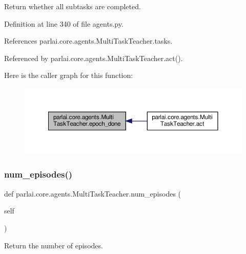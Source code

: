 \begin{DoxyVerb}Return whether all subtasks are completed.\end{DoxyVerb}
 

Definition at line 340 of file agents.\+py.



References parlai.\+core.\+agents.\+Multi\+Task\+Teacher.\+tasks.



Referenced by parlai.\+core.\+agents.\+Multi\+Task\+Teacher.\+act().

Here is the caller graph for this function\+:
\nopagebreak
\begin{figure}[H]
\begin{center}
\leavevmode
\includegraphics[width=350pt]{classparlai_1_1core_1_1agents_1_1MultiTaskTeacher_a17444e342ab19c23cee28bba08a64df9_icgraph}
\end{center}
\end{figure}
\mbox{\label{classparlai_1_1core_1_1agents_1_1MultiTaskTeacher_ac292d1cb86a3769c352e2d3658f324d2}} 
\subsubsection{\texorpdfstring{num\+\_\+episodes()}{num\_episodes()}}
{\footnotesize\ttfamily def parlai.\+core.\+agents.\+Multi\+Task\+Teacher.\+num\+\_\+episodes (\begin{DoxyParamCaption}\item[{}]{self }\end{DoxyParamCaption})}

\begin{DoxyVerb}Return the number of episodes.\end{DoxyVerb}
 

